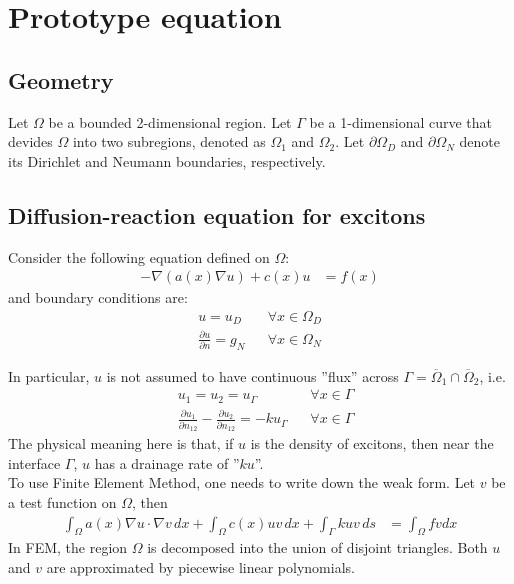 \documentclass{article}
\begin{document}
 \section{Prototype equation}
 \subsection{Geometry}
 Let $\Omega$ be a bounded 2-dimensional region. Let $\Gamma$ be a 1-dimensional curve that devides $\Omega$ into two 
 subregions, denoted as $\Omega_1$ and $\Omega_2$.  Let $\partial \Omega_D$ and $\partial \Omega_N$ denote its 
 Dirichlet and Neumann boundaries, respectively. \\
 
 \subsection{Diffusion-reaction equation for excitons}
 Consider the following equation defined on $\Omega$:
 \begin{align}
  -\nabla \left( a(x) \nabla u \right) + c(x) u &= f(x) 
 \end{align}
 and boundary conditions are:
 \begin{align}
  u = u_D && \forall x \in \Omega_D\\
  \frac{\partial u}{\partial n} = g_N && \forall x \in \Omega_N
 \end{align}
 
 In particular, $u$ is not assumed to have continuous ''flux'' across $\Gamma=\overline{\Omega}_1 \cap 
 \overline{\Omega}_2$, i.e.
 \begin{align}
  &u_1 = u_2 = u_\Gamma && \forall x \in \Gamma \\
  &\frac{\partial u_1}{\partial n_{12}} - \frac{\partial u_2}{\partial n_{12}} = -ku_\Gamma
	  && \forall x \in \Gamma
 \end{align}
 The physical meaning here is that, if $u$ is the density of excitons, then near the interface $\Gamma$, $u$ has a 
 drainage rate of ''$ku$''.\\
 
 To use Finite Element Method, one needs to write down the weak form. Let $v$ be a test function on $\Omega$, then
 \begin{align}
  \int_\Omega a(x) \nabla u \cdot \nabla v\, dx 
  +\int_\Omega c(x)uv\,dx
  +\int_\Gamma kuv\,ds 
  &= \int_\Omega fv dx
 \end{align}
 In FEM, the region $\Omega$ is decomposed into the union of disjoint triangles. Both $u$ and $v$ are approximated by 
 piecewise linear polynomials. 
\end{document}
